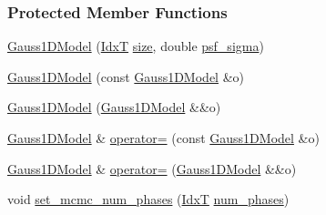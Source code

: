 \subsubsection*{Protected Member Functions}
\begin{DoxyCompactItemize}
\item 
\hyperlink{classmappel_1_1Gauss1DModel_ac4d64dccdf5ec50e53538ee4cef23e39}{Gauss1\+D\+Model} (\hyperlink{namespacemappel_ab17ec0f30b61ece292439d7ece81d3a8}{IdxT} \hyperlink{classmappel_1_1ImageFormat1DBase_a8941b4d028e4dd881146a7c1b9039bb1}{size}, double \hyperlink{classmappel_1_1Gauss1DModel_a62c6b2a5d8ab5f5596504a19daed66b2}{psf\+\_\+sigma})
\item 
\hyperlink{classmappel_1_1Gauss1DModel_a7ae1d38dcb890c6b98c287fb2a1575b2}{Gauss1\+D\+Model} (const \hyperlink{classmappel_1_1Gauss1DModel}{Gauss1\+D\+Model} \&o)
\item 
\hyperlink{classmappel_1_1Gauss1DModel_a3085c37d52754ff25a52e042bc7ecc3b}{Gauss1\+D\+Model} (\hyperlink{classmappel_1_1Gauss1DModel}{Gauss1\+D\+Model} \&\&o)
\item 
\hyperlink{classmappel_1_1Gauss1DModel}{Gauss1\+D\+Model} \& \hyperlink{classmappel_1_1Gauss1DModel_ae26f69421bc365c8b5928276508cc25d}{operator=} (const \hyperlink{classmappel_1_1Gauss1DModel}{Gauss1\+D\+Model} \&o)
\item 
\hyperlink{classmappel_1_1Gauss1DModel}{Gauss1\+D\+Model} \& \hyperlink{classmappel_1_1Gauss1DModel_a27ea4274b62c73a8431129e6d1d38451}{operator=} (\hyperlink{classmappel_1_1Gauss1DModel}{Gauss1\+D\+Model} \&\&o)
\item 
void \hyperlink{classmappel_1_1MCMCAdaptorBase_ad6c75e327e8732abc2654492f372563a}{set\+\_\+mcmc\+\_\+num\+\_\+phases} (\hyperlink{namespacemappel_ab17ec0f30b61ece292439d7ece81d3a8}{IdxT} \hyperlink{classmappel_1_1MCMCAdaptorBase_a44b90a984ace712584074dc17831fe25}{num\+\_\+phases})
\end{DoxyCompactItemize}

